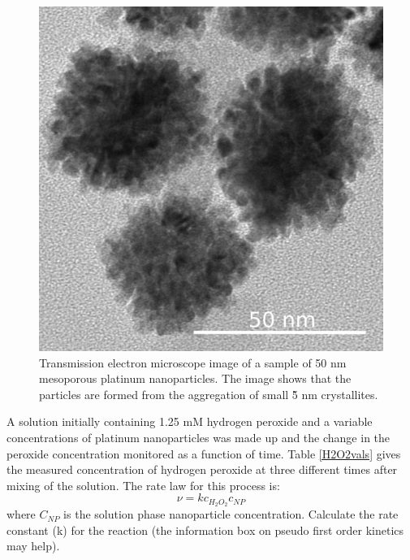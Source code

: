 \documentclass[	DIV=calc,%
							paper=a4,%
							fontsize=11pt,%
							twocolumn]{scrartcl}	 					%
\begin{document}
\begin{figure}
    \centering
    \includegraphics[width=\linewidth]{TEM_kin.png}
    \captionsetup{format=plain}
    \caption{Transmission electron microscope image of a sample of 50 nm mesoporous platinum nanoparticles. The image shows that the particles are formed from the aggregation of small \~ 5 nm crystallites.}
    \label{fig:TEM}
\end{figure}

\noindent A solution initially containing 1.25 mM hydrogen peroxide and a variable concentrations of platinum nanoparticles was made up and the change in the peroxide concentration monitored as a function of time.  
Table \ref{H2O2vals} gives the measured concentration of hydrogen peroxide at three different times after mixing of the solution. The rate law for this process is:
\begin{equation}
    \nu = k c_{H_2O_2} c_{NP}
\end{equation}
where $C_{NP}$ is the solution phase nanoparticle concentration. 
Calculate the rate constant (k) for the reaction (the information box on pseudo first order kinetics may help).
\end{document}
